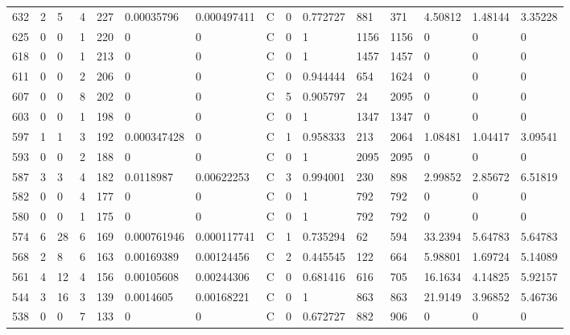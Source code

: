 \begin{latin}
\begin{longtable}{lllllllllllllll}
	632 & 2  & 5   & 4  & 227 & 0.00035796     & 0.000497411    & C & 0  & 0.772727 & 881  & 371  & 4.50812 & 1.48144 & 3.35228 \\
	625 & 0  & 0   & 1  & 220 & 0              & 0              & C & 0  & 1        & 1156 & 1156 & 0       & 0       & 0       \\
	618 & 0  & 0   & 1  & 213 & 0              & 0              & C & 0  & 1        & 1457 & 1457 & 0       & 0       & 0       \\
	611 & 0  & 0   & 2  & 206 & 0              & 0              & C & 0  & 0.944444 & 654  & 1624 & 0       & 0       & 0       \\
	607 & 0  & 0   & 8  & 202 & 0              & 0              & C & 5  & 0.905797 & 24   & 2095 & 0       & 0       & 0       \\
	603 & 0  & 0   & 1  & 198 & 0              & 0              & C & 0  & 1        & 1347 & 1347 & 0       & 0       & 0       \\
	597 & 1  & 1   & 3  & 192 & 0.000347428    & 0              & C & 1  & 0.958333 & 213  & 2064 & 1.08481 & 1.04417 & 3.09541 \\
	593 & 0  & 0   & 2  & 188 & 0              & 0              & C & 0  & 1        & 2095 & 2095 & 0       & 0       & 0       \\
	587 & 3  & 3   & 4  & 182 & 0.0118987      & 0.00622253     & C & 3  & 0.994001 & 230  & 898  & 2.99852 & 2.85672 & 6.51819 \\
	582 & 0  & 0   & 4  & 177 & 0              & 0              & C & 0  & 1        & 792  & 792  & 0       & 0       & 0       \\
	580 & 0  & 0   & 1  & 175 & 0              & 0              & C & 0  & 1        & 792  & 792  & 0       & 0       & 0       \\
	574 & 6  & 28  & 6  & 169 & 0.000761946    & 0.000117741    & C & 1  & 0.735294 & 62   & 594  & 33.2394 & 5.64783 & 5.64783 \\
	568 & 2  & 8   & 6  & 163 & 0.00169389     & 0.00124456     & C & 2  & 0.445545 & 122  & 664  & 5.98801 & 1.69724 & 5.14089 \\
	561 & 4  & 12  & 4  & 156 & 0.00105608     & 0.00244306     & C & 0  & 0.681416 & 616  & 705  & 16.1634 & 4.14825 & 5.92157 \\
	544 & 3  & 16  & 3  & 139 & 0.0014605      & 0.00168221     & C & 0  & 1        & 863  & 863  & 21.9149 & 3.96852 & 5.46736 \\
	538 & 0  & 0   & 7  & 133 & 0              & 0              & C & 0  & 0.672727 & 882  & 906  & 0       & 0       & 0       \\

\end{longtable}
\end{latin}
